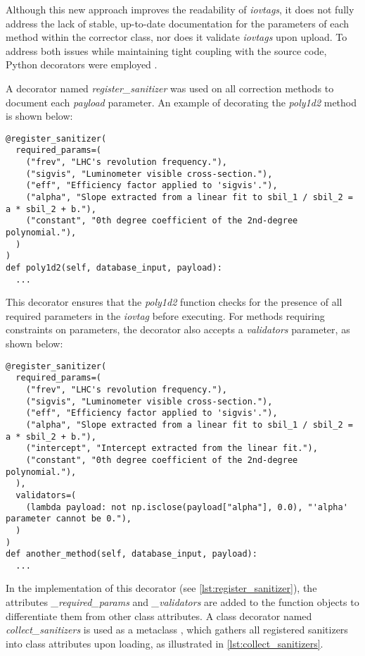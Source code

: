 Although this new approach improves the readability of \textit{iovtags}, it does not fully address the lack of stable, up-to-date documentation for the parameters of each method within the corrector class, nor does it validate \textit{iovtags} upon upload. To address both issues while maintaining tight coupling with the source code, Python decorators were employed \cite{pep318}.

A decorator named \textit{register\_sanitizer} was used on all correction methods to document each \textit{payload} parameter. An example of decorating the \textit{poly1d2} method is shown below:

\begin{lstlisting}
@register_sanitizer(
  required_params=(
    ("frev", "LHC's revolution frequency."),
    ("sigvis", "Luminometer visible cross-section."),
    ("eff", "Efficiency factor applied to 'sigvis'."),
    ("alpha", "Slope extracted from a linear fit to sbil_1 / sbil_2 = a * sbil_2 + b."),
    ("constant", "0th degree coefficient of the 2nd-degree polynomial."),
  )
)
def poly1d2(self, database_input, payload):
  ...
\end{lstlisting}

This decorator ensures that the \textit{poly1d2} function checks for the presence of all required parameters in the \textit{iovtag} before executing. For methods requiring constraints on parameters, the decorator also accepts a \textit{validators} parameter, as shown below:

\begin{lstlisting}
@register_sanitizer(
  required_params=(
    ("frev", "LHC's revolution frequency."),
    ("sigvis", "Luminometer visible cross-section."),
    ("eff", "Efficiency factor applied to 'sigvis'."),
    ("alpha", "Slope extracted from a linear fit to sbil_1 / sbil_2 = a * sbil_2 + b."),
    ("intercept", "Intercept extracted from the linear fit."),
    ("constant", "0th degree coefficient of the 2nd-degree polynomial."),
  ),
  validators=(
    (lambda payload: not np.isclose(payload["alpha"], 0.0), "'alpha' parameter cannot be 0."),
  )
)
def another_method(self, database_input, payload):
  ...
\end{lstlisting}

In the implementation of this decorator (see \autoref{lst:register_sanitizer}), the attributes \textit{\_required\_params} and \textit{\_validators} are added to the function objects to differentiate them from other class attributes. A class decorator named \textit{collect\_sanitizers} is used as a metaclass \cite{pep3115}, which gathers all registered sanitizers into class attributes upon loading, as illustrated in \autoref{lst:collect_sanitizers}.


